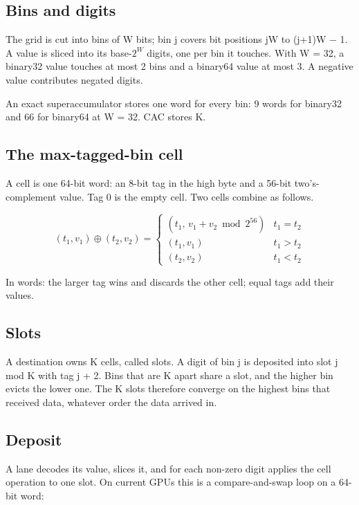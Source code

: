 \documentclass[3p,10pt]{elsarticle}
\begin{document}
\hypertarget{bins-and-digits}{%
\subsection{Bins and digits}\label{bins-and-digits}}

The grid is cut into bins of W bits; bin j covers bit positions jW to
(j+1)W − 1. A value is sliced into its base-\(2^W\) digits, one per bin
it touches. With W = 32, a binary32 value touches at most 2 bins and a
binary64 value at most 3. A negative value contributes negated digits.

An exact superaccumulator stores one word for every bin: 9 words for
binary32 and 66 for binary64 at W = 32. CAC stores K.

\hypertarget{the-max-tagged-bin-cell}{%
\subsection{The max-tagged-bin cell}\label{the-max-tagged-bin-cell}}

A cell is one 64-bit word: an 8-bit tag in the high byte and a 56-bit
two's-complement value. Tag 0 is the empty cell. Two cells combine as
follows.

\[(t_1,v_1)\oplus(t_2,v_2)=\begin{cases}(t_1,\,v_1+v_2 \bmod 2^{56}) & t_1=t_2\\(t_1,v_1) & t_1>t_2\\(t_2,v_2) & t_1<t_2\end{cases}\]

In words: the larger tag wins and discards the other cell; equal tags
add their values.

\hypertarget{slots}{%
\subsection{Slots}\label{slots}}

A destination owns K cells, called slots. A digit of bin j is deposited
into slot j mod K with tag j + 2. Bins that are K apart share a slot,
and the higher bin evicts the lower one. The K slots therefore converge
on the highest bins that received data, whatever order the data arrived
in.

\hypertarget{deposit}{%
\subsection{Deposit}\label{deposit}}

A lane decodes its value, slices it, and for each non-zero digit applies
the cell operation to one slot. On current GPUs this is a
compare-and-swap loop on a 64-bit word:
\end{document}
